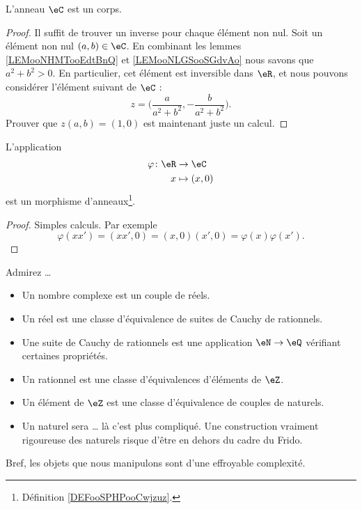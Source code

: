\begin{lemma}		\label{LEMooXTDDooFAjWRm}
	L'anneau \( \eC\) est un corps.
\end{lemma}

\begin{proof}
	Il suffit de trouver un inverse pour chaque élément non nul. Soit un élément non nul \( (a,b)\in \eC\). En combinant les lemmes \ref{LEMooNHMTooEdtBnQ} et \ref{LEMooNLGSooSGdvAo} nous savons que \( a^2+b^2>0\). En particulier, cet élément est inversible dans \( \eR\), et nous pouvons considérer l'élément suivant de \( \eC\) :
	\begin{equation}
		z=\big( \frac{ a }{ a^2+b^2 }, -\frac{ b }{ a^2+b^2 } \big).
	\end{equation}
	Prouver que \( z(a,b)=(1,0)\) est maintenant juste un calcul.
\end{proof}

\begin{lemma}
	L'application
	\begin{equation}
		\begin{aligned}
			\varphi\colon \eR & \to \eC       \\
			x                 & \mapsto (x,0)
		\end{aligned}
	\end{equation}
	est un morphisme d'anneaux\footnote{Définition \ref{DEFooSPHPooCwjzuz}.}.
\end{lemma}

\begin{proof}
	Simples calculs. Par exemple
	\begin{equation}
		\varphi(xx')=(xx',0)=(x,0)(x',0)=\varphi(x)\varphi(x').
	\end{equation}
\end{proof}

\begin{normaltext}
	Admirez \ldots
	\begin{itemize}
		\item Un nombre complexe est un couple de réels.
		\item Un réel est une classe d'équivalence de suites de Cauchy de rationnels.
		\item Une suite de Cauchy de rationnels est une application \( \eN\to \eQ\) vérifiant certaines propriétés.
		\item Un rationnel est une classe d'équivalences d'éléments de \( \eZ\).
		\item Un élément de \( \eZ\) est une classe d'équivalence de couples de naturels.
		\item Un naturel sera \ldots{} là c'est plus compliqué. Une construction vraiment rigoureuse des naturels risque d'être en dehors du cadre du Frido.
	\end{itemize}
	Bref, les objets que nous manipulons sont d'une effroyable complexité.
\end{normaltext}

